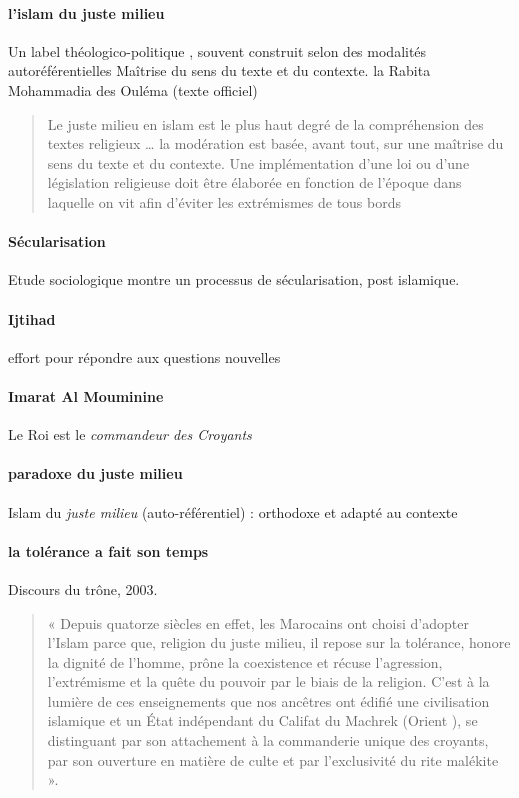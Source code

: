 \paragraph{l'islam du juste milieu}
Un label théologico-politique , souvent construit selon des modalités autoréférentielles Maîtrise du sens du texte et du contexte. 
la Rabita Mohammadia des Ouléma   (texte officiel)
\begin{quote}
    Le juste milieu en islam est le plus haut degré de la compréhension des textes religieux 
\ldots
     la modération est basée, avant tout, sur une maîtrise du sens du texte et du contexte.
  Une implémentation d'une loi ou d'une législation religieuse doit être élaborée en fonction de l'époque dans laquelle on vit afin d'éviter les extrémismes de tous bords
\end{quote}
 




\paragraph{Sécularisation} Etude sociologique montre un processus de sécularisation, post islamique. 

\paragraph{Ijtihad} effort pour répondre aux questions nouvelles

\paragraph{Imarat Al Mouminine} Le Roi est le \textit{commandeur des Croyants}



\paragraph{paradoxe du juste milieu} 
\begin{Def}[al wasatiyya]
    Islam du \textit{juste milieu} (auto-référentiel) : orthodoxe et adapté au contexte
\end{Def}
\paragraph{la tolérance a fait son temps}
Discours du trône, 2003.
\begin{quote}
    
 « Depuis quatorze siècles en effet, les Marocains ont choisi d'adopter l'Islam parce que, religion du juste milieu, il repose sur la tolérance, honore la dignité de l'homme, prône la coexistence et récuse l'agression, l'extrémisme et la quête du pouvoir par le biais de la religion.
C'est à la lumière de ces enseignements que nos ancêtres ont édifié une civilisation islamique et un État indépendant du Califat du Machrek (Orient ), se distinguant par son attachement à la commanderie unique des croyants, par son ouverture en matière de culte et par l'exclusivité du rite malékite ».
\end{quote}

